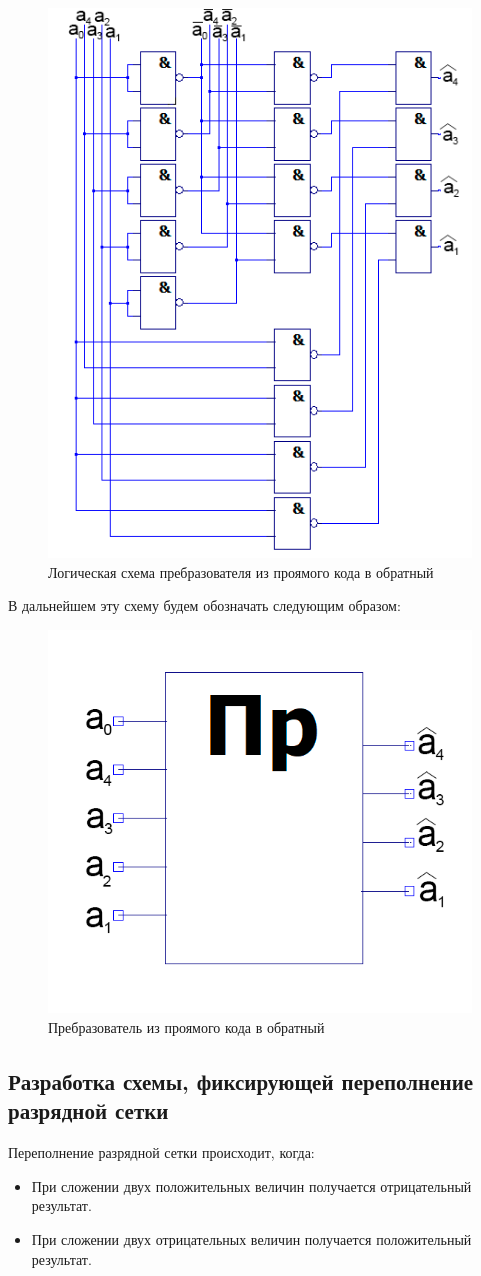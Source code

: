 \documentclass[a4paper,14pt]{article}
\begin{document}
\begin{figure}[H]
	\centering
	\includegraphics[width=0.5\linewidth]{images/preobr_sh}
	\caption{Логическая схема пребразователя из проямого кода в обратный}
	\label{fig:preobr_sh}
\end{figure}

В дальнейшем эту схему будем обозначать следующим образом:

\begin{figure}[H]
	\centering
	\includegraphics[width=0.3\linewidth]{images/preobr_el}
	\caption{Пребразователь из проямого кода в обратный}
	\label{fig:preobr_el}
\end{figure}

\subsection{Разработка схемы, фиксирующей переполнение разрядной сетки}

Переполнение разрядной сетки происходит, когда:
\begin{itemize}
	\item При сложении двух положительных величин получается отрицательный результат.
	
	\item При сложении двух отрицательных величин получается положительный результат.	
\end{itemize}
\end{document}
